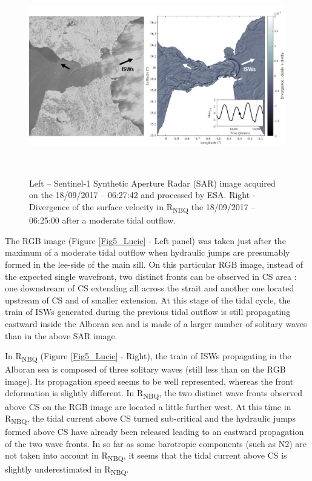 \begin{figure}[!h]
	\begin{Center}
		\includegraphics[width=6.3in,height=3.43in]{./media/image3.png}
	\end{Center}


\caption{Left – Sentinel-1 Synthetic Aperture Radar (SAR) image acquired on the 18/09/2017 – 06:27:42 and processed by ESA. Right - Divergence of the surface velocity in R\textsubscript{NBQ} the 18/09/2017 – 06:25:00 after a moderate tidal outflow. }
\label{Fig3_Lucie}
\end{figure}

\vspace{\baselineskip}
The RGB image (Figure \ref{Fig5_Lucie} - Left panel) was taken just after the maximum of a moderate tidal outflow when hydraulic jumps are presumably formed in the lee-side of the main sill. On this particular RGB image, instead of the expected single wavefront, two distinct fronts can be observed in CS area : one downstream of CS extending all across the strait and another one located upstream of CS and of smaller extension. At this stage of the tidal cycle, the train of ISWs generated during the previous tidal outflow is still propagating eastward inside the Alboran sea and is made of a larger number of solitary waves than in the above SAR image.\par

\vspace{\baselineskip}
In R\textsubscript{NBQ} (Figure \ref{Fig5_Lucie} - Right), the train of ISWs propagating in the Alboran sea is composed of three solitary waves (still less than on the RGB image). Its propagation speed seems to be well represented, whereas the front deformation is slightly different. 
In R\textsubscript{NBQ}, the two distinct wave fronts observed above CS on the RGB image are located a little further west. At this time in R\textsubscript{NBQ}, the tidal current above CS turned sub-critical and the hydraulic jumps formed above CS have already been released leading to an eastward propagation of the two wave fronts. In so far as some barotropic components (such as N2) are not taken into account in R\textsubscript{NBQ}, it seems that the tidal current above CS is slightly underestimated in R\textsubscript{NBQ}.

